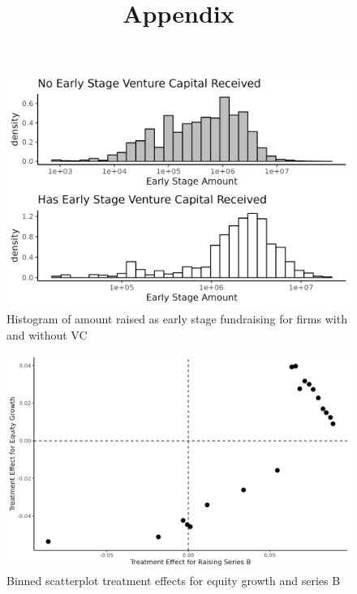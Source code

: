 \documentclass[11pt]{article}
\title{\Large Appendix}
\date{}
\author{}
\begin{document}
\maketitle

\begin{center}
\setcounter{table}{0}
\setcounter{figure}{0}
\renewcommand{\thetable}{A\arabic{table}}
\renewcommand{\thefigure}{A\arabic{figure}}

\newpage
\begin{figure}
  \caption{Histogram of amount raised as early stage fundraising for firms with and without VC}
  \includegraphics[width=.8\textwidth]{vc_distribution_all_early_stage.png}
 \end{figure}


\begin{figure}
  \caption{Binned scatterplot treatment effects for equity growth and series B}
  \includegraphics[width=.85\textwidth]{corr_plot_treatment_effects.png}
\end{figure}
\end{center}
\end{document}
